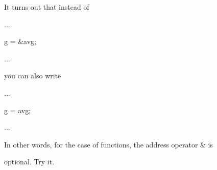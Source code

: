 It turns out that instead of



\begin{consolethree}[escapeinside=||]

...

g = &avg;

...

\end{consolethree}



you can also write



\begin{consolethree}[escapeinside=||]

...

g = avg;

...

\end{consolethree}



In other words, for the case of functions, the address operator \& is

optional. Try it.

